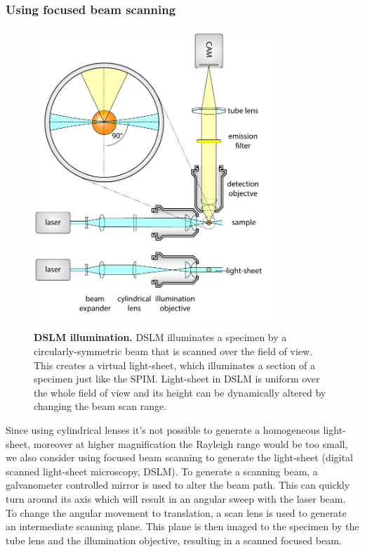 \documentclass{diploma_style}
\begin{document}
\subsubsection{Using focused beam scanning}
\begin{figure}[hbt]
    \centering
    \includegraphics[page=2,width=0.8\textwidth]{figures/1_spim/spim_cyl}
    \caption{\textbf{DSLM illumination.} DSLM illuminates a specimen by a circularly-symmetric beam that is scanned over the field of view. This creates a virtual light-sheet, which illuminates a section of a specimen just like the SPIM. Light-sheet in DSLM is uniform over the whole field of view and its height can be dynamically altered by changing the beam scan range.
}
    \label{fig:dslm}
\end{figure}

Since using cylindrical lenses it's not possible to generate a homogeneous light-sheet, moreover at higher magnification the Rayleigh range would be too small, we also consider using focused beam scanning to generate the light-sheet (digital scanned light-sheet microscopy, DSLM). To generate a scanning beam, a galvanometer controlled mirror is used to alter the beam path. This can quickly turn around its axis which will result in an angular sweep with the laser beam. To change the angular movement to translation, a scan lens is used to generate an intermediate scanning plane. This plane is then imaged to the specimen by the tube lens and the illumination objective, resulting in a scanned focused beam.
\end{document}
